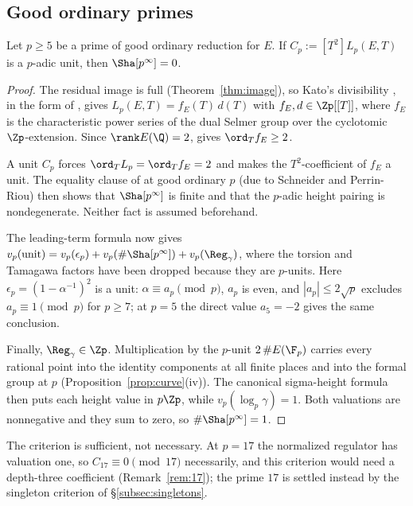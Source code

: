 \subsection{Good ordinary primes}
\begin{lemma}\label{lem:goodord}
Let $p\ge5$ be a prime of good ordinary reduction for $E$. If $C_p:=[T^2]L_p(E,T)$ is a $p$-adic unit, then $\Sha[p^\infty]=0$.
\end{lemma}
\begin{proof}
The residual image is full (Theorem~\ref{thm:image}), so Kato's divisibility \cite{kato}, in the form of \cite[Thm.~7.3]{sw}, gives $L_p(E,T)=f_E(T)\,d(T)$ with $f_E,d\in\Zp[[T]]$, where $f_E$ is the characteristic power series of the dual Selmer group over the cyclotomic $\Zp$-extension. Since $\rank E(\Q)=2$, \cite[Thm.~6.1]{sw} gives $\ord_Tf_E\ge2$.

A unit $C_p$ forces $\ord_TL_p=\ord_Tf_E=2$ and makes the $T^2$-coefficient of $f_E$ a unit. The equality clause of \cite[Thm.~6.1]{sw} at good ordinary $p$ (due to Schneider and Perrin-Riou) then shows that $\Sha[p^\infty]$ is finite and that the $p$-adic height pairing is nondegenerate. Neither fact is assumed beforehand.

The leading-term formula now gives $v_p(\text{unit})=v_p(\epsilon_p)+v_p(\#\Sha[p^\infty])+v_p(\Reg_\gamma)$, where the torsion and Tamagawa factors have been dropped because they are $p$-units. Here $\epsilon_p=(1-\alpha^{-1})^2$ is a unit: $\alpha\equiv a_p\pmod p$, $a_p$ is even, and $|a_p|\le2\sqrt p$ excludes $a_p\equiv1\pmod p$ for $p\ge7$; at $p=5$ the direct value $a_5=-2$ gives the same conclusion.

Finally, $\Reg_\gamma\in\Zp$. Multiplication by the $p$-unit $2\,\#E(\F_p)$ carries every rational point into the identity components at all finite places and into the formal group at $p$ (Proposition~\ref{prop:curve}(iv)). The canonical sigma-height formula \cite[\S4.1]{sw} then puts each height value in $p\Zp$, while $v_p(\log_p\gamma)=1$. Both valuations are nonnegative and they sum to zero, so $\#\Sha[p^\infty]=1$.
\end{proof}
The criterion is sufficient, not necessary. At $p=17$ the normalized regulator has valuation one, so $C_{17}\equiv0\pmod{17}$ necessarily, and this criterion would need a depth-three coefficient (Remark~\ref{rem:17}); the prime $17$ is settled instead by the singleton criterion of \S\ref{subsec:singletons}.

